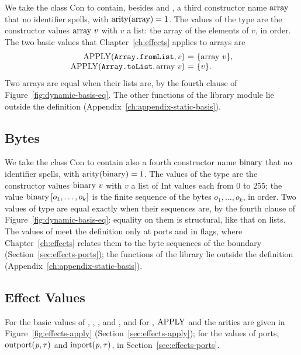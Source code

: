 We take the class Con to contain, besides \kw{[]} and \kw{::}, a third
constructor name $\mathrm{array}$ that no identifier spells, with
$\mathrm{arity}(\mathrm{array})=1$. The values of the type  are the constructor
values $\mathrm{array}\ v$ with $v$ a list: the array of the elements of $v$, in
order. The two basic values that Chapter~\ref{ch:effects} applies to arrays
are
\[
  \begin{array}{@{}r@{\ }c@{\ }l@{}}
  \APPLY(\kw{Array.fromList},v) & = & \{\dbarr\ v\},\\
  \APPLY(\kw{Array.toList},\dbarr\ v) & = & \{v\}.
  \end{array}
\]
Two arrays are equal when their lists are, by the fourth clause of
Figure~\ref{fig:dynamic-basis-eq}. The other functions of the library module
 lie outside the definition (Appendix~\ref{ch:appendix-static-basis}).

\subsection{Bytes}\label{sec:appendix-dynamic-basis-bytes}

We take the class Con to contain also a fourth constructor name $\mathrm{binary}$ that
no identifier spells, with $\mathrm{arity}(\mathrm{binary})=1$. The values of the type
 are the constructor values $\dbbin\ v$ with $v$ a list of Int
values each from $0$ to $255$; the value $\mathrm{binary}\,[o_1,\ldots,o_k]$ is the
finite sequence of the bytes $o_1,\ldots,o_k$, in order. %
Two values of type  are equal exactly when their sequences are, by
the fourth clause of Figure~\ref{fig:dynamic-basis-eq}: equality on them is
structural, like that on lists. %
The values of  meet the definition only at ports and in flags,
where Chapter~\ref{ch:effects} relates them to the byte sequences of the
boundary (Section~\ref{sec:effects-ports}); the functions of the library
 lie outside the definition
(Appendix~\ref{ch:appendix-static-basis}).

\subsection{Effect Values}\label{sec:appendix-dynamic-basis-effects}

For the basic values of , , ,
 and , and for , $\mathrm{APPLY}$ and
the arities are given in Figure~\ref{fig:effects-apply}
(Section~\ref{sec:effects-apply}); for the values of ports,
$\mathrm{outport}(\mathit{p},\tau)$ and $\mathrm{inport}(\mathit{p},\tau)$, in
Section~\ref{sec:effects-ports}. %
